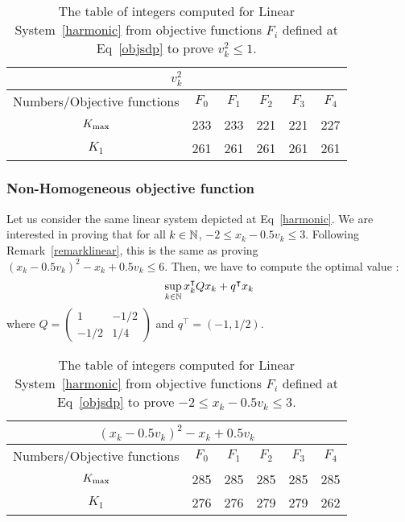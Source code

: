 \documentclass[10pt]{llncs}
\begin{document}
\begin{table}[H]
\begin{center}
\begin{tabular}{|c|c|c|c|c|c|}
\hline
\multicolumn{6}{|c|}{$v_k^2$}\\
\hline
Numbers/Objective functions & $F_0$ & $F_{1}$ & $F_{2}$ & $F_3$ & $F_4$ \\
\hline
$K_{\rm max}$ &233 &233 &221 & 221&227 \\
\hline
 $K_{1}$ &261 &261 &261 &261 &261 \\
\hline
\end{tabular}
\end{center}
\caption{The table of integers computed for Linear System~\eqref{harmonic} from objective functions $F_i$ defined at Eq~\eqref{objsdp} to prove $v_k^2\leq 1$.}
\end{table}

\subsubsection{Non-Homogeneous objective function}
Let us consider the same linear system depicted at Eq~\ref{harmonic}. We are interested in proving that for all $k\in\mathbb{N}$, $-2\leq x_k-0.5v_k\leq 3$. Following Remark~\ref{remarklinear}, this is the same as proving $(x_k-0.5 v_k)^2-x_k+0.5 v_k\leq 6$. Then, we have to compute the optimal value :
\[
\sup_{k\in\mathbb{N}} x_k^\intercal Q x_k+q^\intercal x_k
\]
where $Q=\begin{pmatrix} 1 & -1/2 \\ -1/2 & 1/4\end{pmatrix}$ and $q^\intercal=(-1,1/2)$. 

\begin{table}[h!]
\begin{center}
\begin{tabular}{|c|c|c|c|c|c|}
\hline
\multicolumn{6}{|c|}{$(x_k-0.5 v_k)^2-x_k+0.5 v_k$}\\
\hline
Numbers/Objective functions & $F_0$ & $F_{1}$ & $F_{2}$ & $F_3$ & $F_4$ \\
\hline
$K_{\rm max}$ & 285&285 &285 &285 &285 \\
\hline
 $K_{1}$ &276 &276 &279 &279 &262 \\
\hline
\end{tabular}
\end{center}
\caption{The table of integers computed for Linear System~\eqref{harmonic} from objective functions $F_i$ defined at Eq~\eqref{objsdp} to prove $-2\leq x_k-0.5v_k\leq 3$.}
\end{table}
\end{document}
